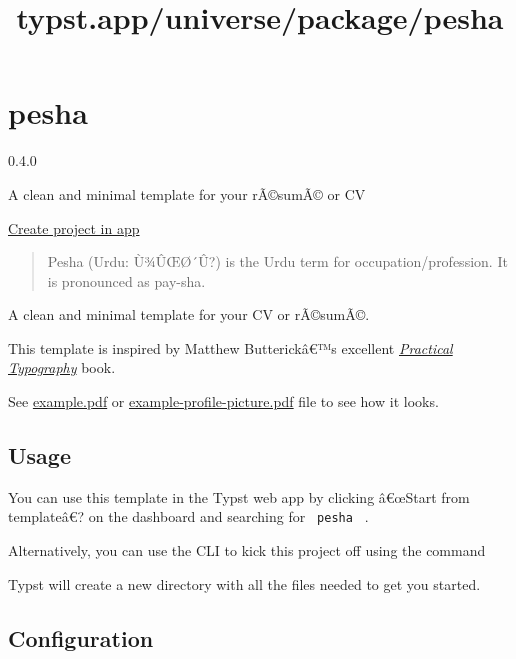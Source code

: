 \title{typst.app/universe/package/pesha}

\label{banner}
\label{template-thumbnail}

\section{pesha}\label{pesha}

{ 0.4.0 }

A clean and minimal template for your rÃ©sumÃ© or CV

\href{/app?template=pesha&version=0.4.0}{Create project in app}

\label{readme}
\begin{quote}
Pesha (Urdu: Ù¾ÛŒØ´Û?) is the Urdu term for occupation/profession. It is
pronounced as pay-sha.
\end{quote}

A clean and minimal template for your CV or rÃ©sumÃ©.

This template is inspired by Matthew Butterickâ€™s excellent
\href{https://practicaltypography.com/}{\emph{Practical Typography}}
book.

See
\href{https://github.com/talal/pesha/blob/main/example.pdf}{example.pdf}
or
\href{https://github.com/talal/pesha/blob/main/example-profile-picture.pdf}{example-profile-picture.pdf}
file to see how it looks.

\subsection{Usage}\label{usage}

You can use this template in the Typst web app by clicking â€œStart from
templateâ€? on the dashboard and searching for \texttt{\ pesha\ } .

Alternatively, you can use the CLI to kick this project off using the
command

\begin{Shaded}
\begin{Highlighting}[]
\end{Highlighting}
\end{Shaded}

Typst will create a new directory with all the files needed to get you
started.

\subsection{Configuration}\label{configuration}

